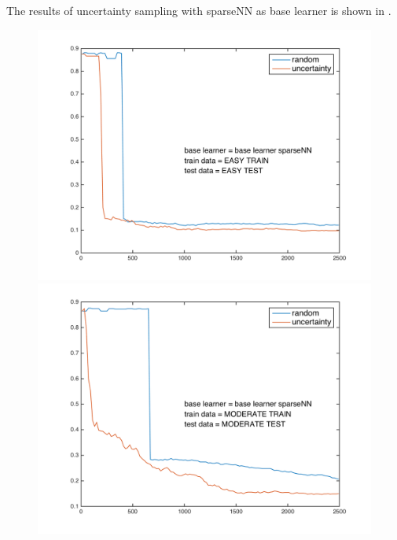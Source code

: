 \documentclass{article}
\begin{document}
The results of uncertainty sampling with sparseNN as base learner is shown in . 
  \begin{figure}[!ht]
    \begin{minipage}{.31\textwidth}
      \centering
      \includegraphics[width=1\linewidth]{../sparseNN_simple}
    \end{minipage}
    \hfill
    \begin{minipage}{.31\textwidth}
      \centering
      \includegraphics[width=1\linewidth]{../sparseNN_moderate}
    \end{minipage}
    \hfill
    \centering
    \begin{minipage}{.31\textwidth}
      \centering

\end{minipage}
\end{figure}
\end{document}
